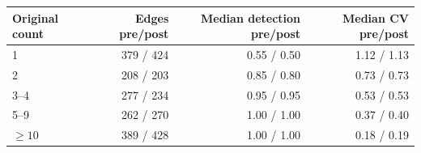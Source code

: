 \begin{tabular}{lrrr}
\toprule
Original count & Edges pre/post & Median detection pre/post & Median CV pre/post \\
\midrule
1 & 379 / 424 & 0.55 / 0.50 & 1.12 / 1.13 \\
2 & 208 / 203 & 0.85 / 0.80 & 0.73 / 0.73 \\
3--4 & 277 / 234 & 0.95 / 0.95 & 0.53 / 0.53 \\
5--9 & 262 / 270 & 1.00 / 1.00 & 0.37 / 0.40 \\
$\geq10$ & 389 / 428 & 1.00 / 1.00 & 0.18 / 0.19 \\
\bottomrule
\end{tabular}
